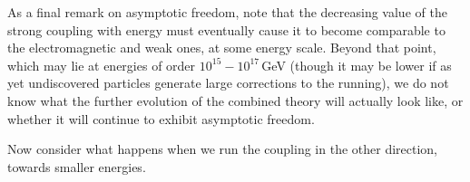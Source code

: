 %
As a final remark on asymptotic freedom, note
that the decreasing 
value of the  strong coupling with energy must eventually cause it to
become comparable to the electromagnetic and weak ones, at some energy
scale. Beyond that point, which may lie at energies of order
$10^{15}-10^{17}\,$GeV (though it may be lower if as yet undiscovered
particles generate large corrections to the running), 
we do not know  what the further evolution of the combined theory will 
actually look like, or whether it will continue to exhibit
asymptotic
freedom. 

%
%
%
Now consider what happens when we run the coupling in the other
direction, towards smaller energies. 
